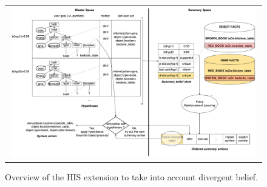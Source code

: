 \documentclass[a4paper,11pt,twoside]{StyleThese}
\begin{document}
\begin{figure}[t!]
   \vspace{-10pt}
 \centering
 \begin{tabular}{c}
  \includegraphics[width=0.98\textwidth]{img/MaRDHIS.pdf}
 \end{tabular}
 \caption{Overview of the HIS extension to take into account divergent belief.}
 \label{fig:overview-mardhis}
   \vspace{-10pt}
\end{figure}
\end{document}
